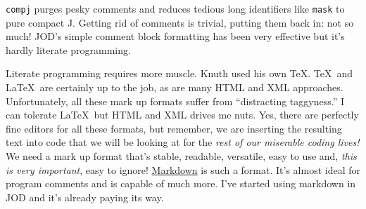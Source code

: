 \small
\begin{tcolorbox}[breakable, size=fbox, boxrule=1pt, pad at break*=1mm,colback=cellbackground, colframe=cellborder]
\begin{Highlighting}[]
   \FunctionTok{;}\FunctionTok{\{} 
\AlertTok{=:}\OtherTok{:}
\RegionMarkerTok{((}\FunctionTok{-#}\RegionMarkerTok{)(}\RegionMarkerTok{)}\RegionMarkerTok{)}
\FunctionTok{~:}\OtherTok{/\textbackslash{}}
\RegionMarkerTok{(}\FunctionTok{#}\RegionMarkerTok{)}\FunctionTok{<}\FunctionTok{#}
\RegionMarkerTok{)}
\end{Highlighting}
\end{tcolorbox}
\normalsize

\texttt{compj} purges pesky comments and reduces tedious long
identifiers like \texttt{mask} to pure compact J. Getting rid of
comments is trivial, putting them back in: not so much! JOD's simple
comment block formatting has been very effective but it's hardly
literate programming.

Literate programming requires more muscle. Knuth used his own \TeX. \TeX\
and \LaTeX\ are certainly up to the job, as are many HTML and XML
approaches. Unfortunately, all these mark up formats suffer from
``distracting taggyness.'' I can tolerate \LaTeX\ but HTML and XML drives
me nuts. Yes, there are perfectly fine editors for all these formats, but
remember, we are inserting the resulting text into code that we will be
looking at for the \emph{rest of our miserable coding lives!} We need a
mark up format that's stable, readable, versatile, easy to use and,
\emph{this is very important}, easy to ignore!
\href{http://daringfireball.net/projects/markdown/}{Markdown} is such a
format. It's almost ideal for program comments and is capable of much
more. I've started using markdown in JOD and it's already paying its
way.

